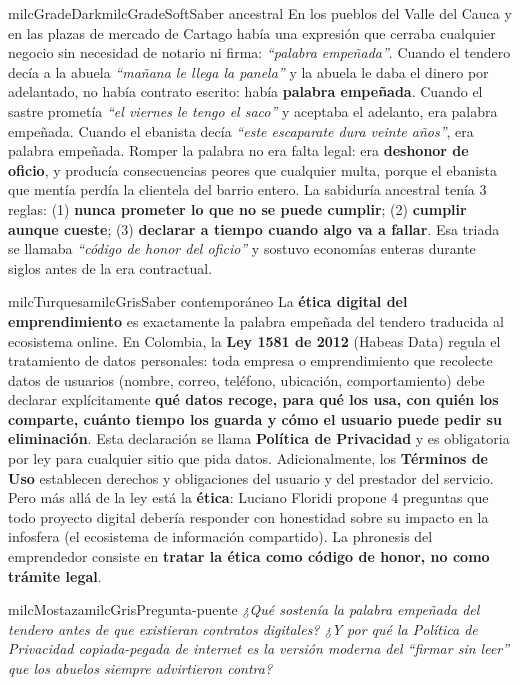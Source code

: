 \documentclass[11pt,letterpaper]{article}
\begin{document}
\begin{softbox}{milcGradeDark}{milcGradeSoft}{Saber ancestral}
En los pueblos del Valle del Cauca y en las plazas de mercado de Cartago había una expresión que cerraba cualquier negocio sin necesidad de notario ni firma: \emph{``palabra empeñada''}. Cuando el tendero decía a la abuela \emph{``mañana le llega la panela''} y la abuela le daba el dinero por adelantado, no había contrato escrito: había \textbf{palabra empeñada}. Cuando el sastre prometía \emph{``el viernes le tengo el saco''} y aceptaba el adelanto, era palabra empeñada. Cuando el ebanista decía \emph{``este escaparate dura veinte años''}, era palabra empeñada. Romper la palabra no era falta legal: era \textbf{deshonor de oficio}, y producía consecuencias peores que cualquier multa, porque el ebanista que mentía perdía la clientela del barrio entero. La sabiduría ancestral tenía 3 reglas: (1) \textbf{nunca prometer lo que no se puede cumplir}; (2) \textbf{cumplir aunque cueste}; (3) \textbf{declarar a tiempo cuando algo va a fallar}. Esa triada se llamaba \emph{``código de honor del oficio''} y sostuvo economías enteras durante siglos antes de la era contractual.
\end{softbox}

\begin{softbox}{milcTurquesa}{milcGris}{Saber contemporáneo}
La \textbf{ética digital del emprendimiento} es exactamente la palabra empeñada del tendero traducida al ecosistema online. En Colombia, la \textbf{Ley 1581 de 2012} (Habeas Data) regula el tratamiento de datos personales: toda empresa o emprendimiento que recolecte datos de usuarios (nombre, correo, teléfono, ubicación, comportamiento) debe declarar explícitamente \textbf{qué datos recoge, para qué los usa, con quién los comparte, cuánto tiempo los guarda y cómo el usuario puede pedir su eliminación}. Esta declaración se llama \textbf{Política de Privacidad} y es obligatoria por ley para cualquier sitio que pida datos. Adicionalmente, los \textbf{Términos de Uso} establecen derechos y obligaciones del usuario y del prestador del servicio. Pero más allá de la ley está la \textbf{ética}: Luciano Floridi propone 4 preguntas que todo proyecto digital debería responder con honestidad sobre su impacto en la infosfera (el ecosistema de información compartido). La phronesis del emprendedor consiste en \textbf{tratar la ética como código de honor, no como trámite legal}.
\end{softbox}

\begin{softbox}{milcMostaza}{milcGris}{Pregunta-puente}
\textit{¿Qué sostenía la palabra empeñada del tendero antes de que existieran contratos digitales? ¿Y por qué la Política de Privacidad copiada-pegada de internet es la versión moderna del \emph{``firmar sin leer''} que los abuelos siempre advirtieron contra?}
\end{softbox}
\end{document}
